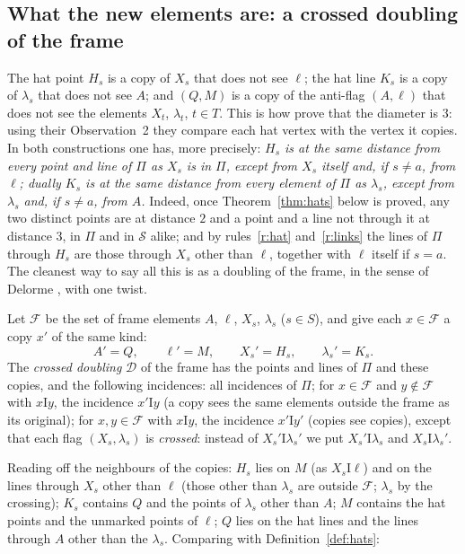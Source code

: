 \documentclass[11pt]{amsart}
\theoremstyle{definition}
\theoremstyle{remark}
\newcommand{\I}{\mathrel{\mathrm{I}}}
\newcommand{\cS}{\mathcal{S}}
\newcommand{\cD}{\mathcal{D}}
\newcommand{\cF}{\mathcal{F}}
\newcommand{\lam}{\lambda}
\begin{document}
\subsection{What the new elements are: a crossed doubling of the frame}\label{ssec:doubling}
The hat point $H_s$ is a copy of $X_s$ that does not see $\ell$; the hat line $K_s$ is a copy of $\lam_s$ that does not see $A$; and $(Q,M)$ is a copy of the anti-flag $(A,\ell)$ that does not see the elements $X_t$, $\lam_t$, $t\in T$. This is how \cite{AL20} prove that the diameter is $3$: using their Observation~2 they compare each hat vertex with the vertex it copies. In both constructions one has, more precisely: \emph{$H_s$ is at the same distance from every point and line of $\Pi$ as $X_s$ is in $\Pi$, except from $X_s$ itself and, if $s\neq a$, from $\ell$; dually $K_s$ is at the same distance from every element of $\Pi$ as $\lam_s$, except from $\lam_s$ and, if $s\ne a$, from $A$.} Indeed, once Theorem~\ref{thm:hats} below is proved, any two distinct points are at distance $2$ and a point and a line not through it at distance $3$, in $\Pi$ and in $\cS$ alike; and by rules~\ref{r:hat} and~\ref{r:links} the lines of $\Pi$ through $H_s$ are those through $X_s$ other than $\ell$, together with $\ell$ itself if $s=a$. The cleanest way to say all this is as a doubling of the frame, in the sense of Delorme \cite{D85a}, with one twist.

Let $\cF$ be the set of frame elements $A$, $\ell$, $X_s$, $\lam_s$ ($s\in S$), and give each $x\in\cF$ a copy $x'$ of the same kind:
\[
A'=Q,\qquad \ell'=M,\qquad X_s'=H_s,\qquad \lam_s'=K_s .
\]
The \emph{crossed doubling} $\cD$ of the frame has the points and lines of $\Pi$ and these copies, and the following incidences: all incidences of $\Pi$; for $x\in\cF$ and $y\notin\cF$ with $x\I y$, the incidence $x'\I y$ (a copy sees the same elements outside the frame as its original); for $x,y\in\cF$ with $x\I y$, the incidence $x'\I y'$ (copies see copies), except that each flag $(X_s,\lam_s)$ is \emph{crossed}: instead of $X_s'\I\lam_s'$ we put $X_s'\I\lam_s$ and $X_s\I\lam_s'$.

Reading off the neighbours of the copies: $H_s$ lies on $M$ (as $X_s\I\ell$) and on the lines through $X_s$ other than $\ell$ (those other than $\lam_s$ are outside $\cF$; $\lam_s$ by the crossing); $K_s$ contains $Q$ and the points of $\lam_s$ other than $A$; $M$ contains the hat points and the unmarked points of $\ell$; $Q$ lies on the hat lines and the lines through $A$ other than the $\lam_s$. Comparing with Definition~\ref{def:hats}:
\end{document}
